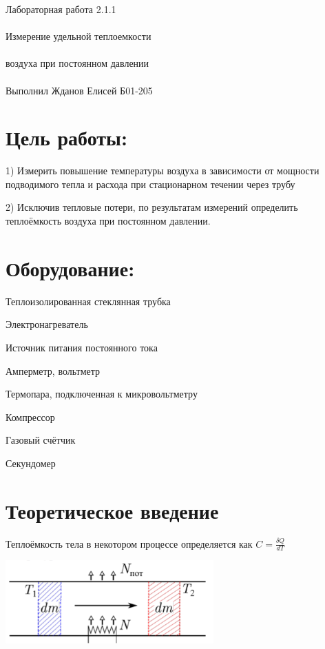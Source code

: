 \documentclass{astroedu-lab}
\begin{document}
\pagestyle{plain}

\begin{problem}{\huge Лабораторная работа 2.1.1\\\\Измерение удельной теплоемкости\\\\воздуха при постоянном давлении\\\\Выполнил Жданов Елисей Б01-205}

\section{Цель работы:}

1) Измерить повышение температуры воздуха в зависимости от мощности подводимого тепла и расхода при стационарном течении через трубу
	
2) Исключив тепловые потери, по результатам измерений определить теплоёмкость воздуха при постоянном давлении.
	

\section{Оборудование:}

Теплоизолированная стеклянная трубка

Электронагреватель

Источник питания постоянного тока

Амперметр, вольтметр

Термопара, подключенная к микровольтметру

Компрессор

Газовый счётчик

Секундомер




\section{Теоретическое введение}
	
		 Теплоёмкость тела в некотором процессе определяется как $ C = \frac{\delta Q}{dT}$


\begin{center}
\includegraphics[width=0.6\textwidth]{lab_2_1_1.png}
\label{ris:image}
\end{center}



\end{problem}
\end{document}
